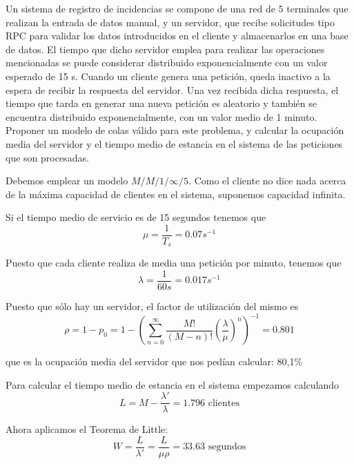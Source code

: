\begin{problem}[13]

Un sistema de registro de incidencias se compone de una red de 5 terminales que realizan la entrada de datos manual, y un servidor, que recibe solicitudes tipo RPC para validar los datos introducidos en el cliente y almacenarlos en una base de datos. El tiempo que dicho servidor emplea para realizar las operaciones mencionadas se puede considerar distribuido exponencialmente con un valor esperado de 15 s. Cuando un cliente genera una petición, queda inactivo a la espera de recibir la respuesta del servidor. Una vez recibida dicha respuesta, el tiempo que tarda en generar una nueva petición es aleatorio y también se encuentra distribuido exponencialmente, con un valor medio de 1 minuto. Proponer un modelo de colas válido para este problema, y calcular la ocupación media del servidor y el tiempo medio de estancia en el sistema de las peticiones que son procesadas.

\solution

Debemos emplear un modelo $M/M/1/\infty/5$. Como el cliente no dice nada acerca de la máxima capacidad de clientes en el sistema, suponemos capacidad infinita.

Si el tiempo medio de servicio es de 15 segundos tenemos que
\[μ=\frac{1}{T_s}=0.07 s^{-1}\]

Puesto que cada cliente realiza de media una petición por minuto, tenemos que
\[λ=\frac{1}{60s}=0.017 s^{-1}\]

Puesto que sólo hay un servidor, el factor de utilización del mismo es
\[ρ=1-p_0 =1-\left(\sum_{n=0}^{\infty} \frac{M!}{(M-n)!}\left( \frac{λ}{μ}\right)^n \right)^{-1}=0.801\]

que es la ocupación media del servidor que nos pedían calcular: 80,1\%

Para calcular el tiempo medio de estancia en el sistema empezamos calculando
\[L=M-\frac{λ'}{λ}=1.796 \text{ clientes}\]

Ahora aplicamos el Teorema de Little:
\[W=\frac{L}{λ'}=\frac{L}{μρ}=33.63\text{ segundos}\]

\end{problem}


